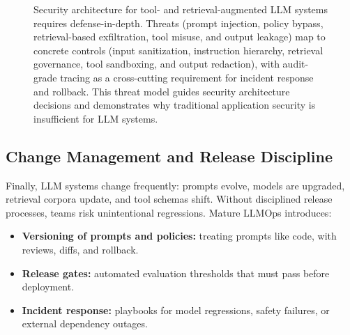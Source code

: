 \begin{landscape}
\begin{figure}[t]
\begin{llmfigbox}
  \end{llmfigbox}
  \caption{Security architecture for tool- and retrieval-augmented LLM systems requires defense-in-depth. Threats (prompt injection, policy bypass, retrieval-based exfiltration, tool misuse, and output leakage) map to concrete controls (input sanitization, instruction hierarchy, retrieval governance, tool sandboxing, and output redaction), with audit-grade tracing as a cross-cutting requirement for incident response and rollback. This threat model guides security architecture decisions and demonstrates why traditional application security is insufficient for LLM systems.}
  \label{fig:ch01_llm_threat_model}
\end{figure}
\end{landscape}

\subsection{Change Management and Release Discipline}
Finally, LLM systems change frequently: prompts evolve, models are upgraded, retrieval corpora update, and tool schemas shift. Without disciplined release processes, teams risk unintentional regressions. Mature LLMOps introduces:
\begin{itemize}
  \item \textbf{Versioning of prompts and policies:} treating prompts like code, with reviews, diffs, and rollback.
  \item \textbf{Release gates:} automated evaluation thresholds that must pass before deployment.
  \item \textbf{Incident response:} playbooks for model regressions, safety failures, or external dependency outages.
\end{itemize}

